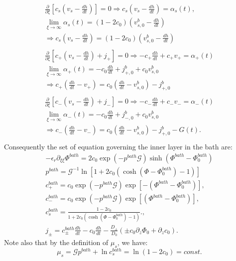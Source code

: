 \documentclass[12pt]{extarticle}
\begin{document}
\begin{eqnarray}
\begin{aligned}
\frac{\partial }{\partial \xi} \left[c_s\left(v_s -\frac{dh}{dt}\right)\right]=  0 \Rightarrow c_s\left(v_s -\frac{dh}{dt}\right)=\alpha_s(t),\\
\lim_{\xi\rightarrow\infty} \alpha_s(t) = (1-2c_0)\left(v^b_{s,0}-\frac{dh}{dt}\right)\\
 \Rightarrow  c_s \left(v_s-\frac{dh}{dt}\right)=(1-2c_0)\left(v^b_{s,0}-\frac{dh}{dt}\right)
\end{aligned}\\[4mm]
\begin{aligned}
\frac{\partial}{\partial \xi}\left[c_+\left(v_s-\frac{dh}{dt}\right)+j_+\right]= 0\Rightarrow -c_+ \frac{dh}{dt}+c_+v_+=\alpha_{+}(t)\\
\lim_{\xi\rightarrow\infty} \alpha_+(t) = -c_0 \frac{dh}{dt}  +j^b_{+,0} +c_0 v^b_{s,0}\\
\Rightarrow  c_+ \left(\frac{dh}{dt}-v_+\right)=c_0 \left(\frac{dh}{dt}-v^b_{s,0}\right) -j^b_{+,0}
\end{aligned}\\[4mm]
\begin{aligned}
\frac{\partial}{\partial \xi}\left[c_-\left(v_s-\frac{dh}{dt}\right)+j_-\right]= 0\Rightarrow -c_- \frac{dh}{dt}+c_-v_-=\alpha_{-}(t)\\
\lim_{\xi\rightarrow\infty} \alpha_-(t) = -c_0 \frac{dh}{dt}  +j^b_{-,0} +c_0 v^b_{s,0}\\
\Rightarrow  c_- \left(\frac{dh}{dt} -v_-\right)=c_0 \left(\frac{dh}{dt} -v^b_{s,0}\right) -j^b_{+,0}-G(t).
\end{aligned}\\
\end{eqnarray}
Consequently the set of equation governing the inner layer in the bath are:
\begin{gather}
-\epsilon_r\partial_{\xi\xi} \Phi^{bath} = 2c_0\exp(-p^{bath}\mathcal{G}) \sinh(\Phi^{bath}-\Phi_0^{bath})\\
p^{bath} = \mathcal{G}^{-1}\ln\left[1+2c_0\left(\cosh(\Phi-\Phi_0^{bath})-1\right)\right] \\
c^{bath}_+ = c_0\exp(-p^{bath}\mathcal{G})\exp[-(\Phi^{bath}-\Phi_0^{bath})],\\
c^{bath}_- = c_0\exp(-p^{bath}\mathcal{G}) \exp[(\Phi^{bath}-\Phi_0^{bath})],\\
c^{bath}_s = \frac{1-2c_0}{1+2c_0\left(\cosh(\Phi-\Phi_0^{bath})-1\right)}.,\\
j_\pm=c^{bath}_\pm\frac{dh}{dt}- c_0 \frac{dh}{dt}  -\frac{D_\pm}{D_0}\left(\pm c_0 \partial_z \Phi_0+\partial_z c_0\right).
\end{gather}
Note also that by the definition of $\mu_s$, we have:
\begin{equation}
\mu_s= \mathcal{G}p^{bath}+\ln c^{bath}_s=\ln(1-2c_0)= const.
\end{equation}
\end{document}
